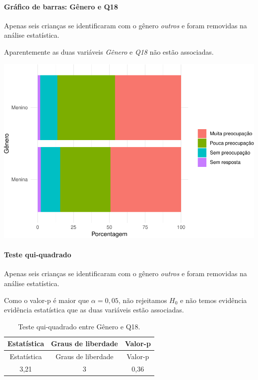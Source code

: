 \documentclass[]{article}
\let\oldparagraph\paragraph
\renewcommand{\paragraph}[1]{\oldparagraph{#1}\mbox{}}
\begin{document}
\hypertarget{gruxe1fico-de-barras-guxeanero-e-q18}{%
\paragraph{Gráfico de barras: Gênero e Q18}\label{gruxe1fico-de-barras-guxeanero-e-q18}}

Apenas seis crianças se identificaram com o gênero \emph{outros} e foram removidas na análise estatística.

Aparentemente as duas variáveis \emph{Gênero} e \emph{Q18} não estão associadas.

\begin{center}\includegraphics[width=0.75\linewidth]{relatorio_files/figure-latex/unnamed-chunk-227-1} \end{center}

\hypertarget{teste-qui-quadrado-24}{%
\paragraph{Teste qui-quadrado}\label{teste-qui-quadrado-24}}

Apenas seis crianças se identificaram com o gênero \emph{outros} e foram removidas na análise estatística.

Como o valor-p é maior que \(\alpha=0,05\), não rejeitamos \(H_0\) e não temos evidência evidência estatística que as duas variáveis estão associadas.

\begin{longtable}[]{@{}ccc@{}}
\caption{\label{tab:unnamed-chunk-228}Teste qui-quadrado entre Gênero e Q18.}\tabularnewline
\toprule
Estatística & Graus de liberdade & Valor-p\tabularnewline
\midrule
\endfirsthead
\toprule
Estatística & Graus de liberdade & Valor-p\tabularnewline
\midrule
\endhead
3,21 & 3 & 0,36\tabularnewline
\bottomrule
\end{longtable}
\end{document}
